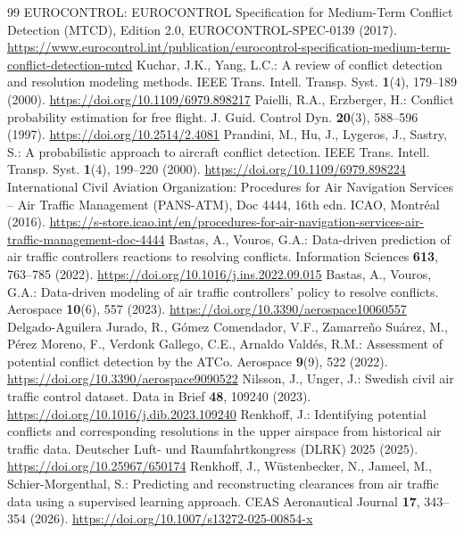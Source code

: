 \documentclass[pdflatex,sn-mathphys-num]{sn-jnl}
\begin{document}
\begin{thebibliography}{99}
 EUROCONTROL: EUROCONTROL Specification for Medium-Term Conflict Detection (MTCD), Edition 2.0, EUROCONTROL-SPEC-0139 (2017). \url{https://www.eurocontrol.int/publication/eurocontrol-specification-medium-term-conflict-detection-mtcd}
 Kuchar, J.K., Yang, L.C.: A review of conflict detection and resolution modeling methods. IEEE Trans. Intell. Transp. Syst. \textbf{1}(4), 179--189 (2000). \url{https://doi.org/10.1109/6979.898217}
 Paielli, R.A., Erzberger, H.: Conflict probability estimation for free flight. J. Guid. Control Dyn. \textbf{20}(3), 588--596 (1997). \url{https://doi.org/10.2514/2.4081}
 Prandini, M., Hu, J., Lygeros, J., Sastry, S.: A probabilistic approach to aircraft conflict detection. IEEE Trans. Intell. Transp. Syst. \textbf{1}(4), 199--220 (2000). \url{https://doi.org/10.1109/6979.898224}
 International Civil Aviation Organization: Procedures for Air Navigation Services -- Air Traffic Management (PANS-ATM), Doc 4444, 16th edn. ICAO, Montr\'eal (2016). \url{https://s-store.icao.int/en/procedures-for-air-navigation-services-air-traffic-management-doc-4444}
 Bastas, A., Vouros, G.A.: Data-driven prediction of air traffic controllers reactions to resolving conflicts. Information Sciences \textbf{613}, 763--785 (2022). \url{https://doi.org/10.1016/j.ins.2022.09.015}
 Bastas, A., Vouros, G.A.: Data-driven modeling of air traffic controllers' policy to resolve conflicts. Aerospace \textbf{10}(6), 557 (2023). \url{https://doi.org/10.3390/aerospace10060557}
 Delgado-Aguilera Jurado, R., G\'omez Comendador, V.F., Zamarre\~no Su\'arez, M., P\'erez Moreno, F., Verdonk Gallego, C.E., Arnaldo Vald\'es, R.M.: Assessment of potential conflict detection by the ATCo. Aerospace \textbf{9}(9), 522 (2022). \url{https://doi.org/10.3390/aerospace9090522}
 Nilsson, J., Unger, J.: Swedish civil air traffic control dataset. Data in Brief \textbf{48}, 109240 (2023). \url{https://doi.org/10.1016/j.dib.2023.109240}
 Renkhoff, J.: Identifying potential conflicts and corresponding resolutions in the upper airspace from historical air traffic data. Deutscher Luft- und Raumfahrtkongress (DLRK) 2025 (2025). \url{https://doi.org/10.25967/650174}
 Renkhoff, J., W\"ustenbecker, N., Jameel, M., Schier-Morgenthal, S.: Predicting and reconstructing clearances from air traffic data using a supervised learning approach. CEAS Aeronautical Journal \textbf{17}, 343--354 (2026). \url{https://doi.org/10.1007/s13272-025-00854-x}

\end{thebibliography}
\end{document}
